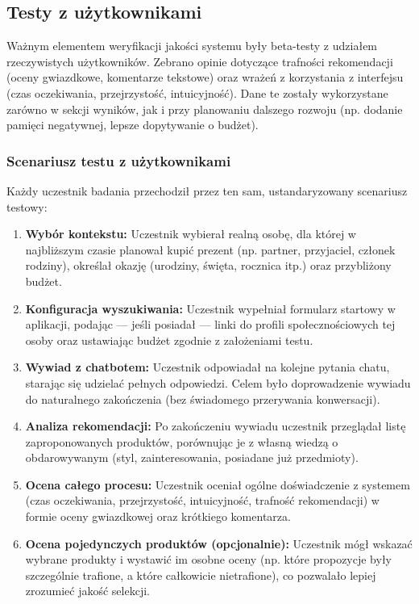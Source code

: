 \documentclass[12pt,a4paper]{article}
\begin{document}
\subsection{Testy z użytkownikami}
Ważnym elementem weryfikacji jakości systemu były beta-testy z udziałem rzeczywistych użytkowników. Zebrano opinie dotyczące trafności rekomendacji (oceny gwiazdkowe, komentarze tekstowe) oraz wrażeń z korzystania z interfejsu (czas oczekiwania, przejrzystość, intuicyjność). Dane te zostały wykorzystane zarówno w sekcji wyników, jak i przy planowaniu dalszego rozwoju (np. dodanie pamięci negatywnej, lepsze dopytywanie o budżet).

\subsubsection*{Scenariusz testu z użytkownikami}
Każdy uczestnik badania przechodził przez ten sam, ustandaryzowany scenariusz testowy:
\begin{enumerate}
    \item \textbf{Wybór kontekstu:} Uczestnik wybierał realną osobę, dla której w najbliższym czasie planował kupić prezent (np. partner, przyjaciel, członek rodziny), określał okazję (urodziny, święta, rocznica itp.) oraz przybliżony budżet.
    \item \textbf{Konfiguracja wyszukiwania:} Uczestnik wypełniał formularz startowy w aplikacji, podając — jeśli posiadał — linki do profili społecznościowych tej osoby oraz ustawiając budżet zgodnie z założeniami testu.
    \item \textbf{Wywiad z chatbotem:} Uczestnik odpowiadał na kolejne pytania chatu, starając się udzielać pełnych odpowiedzi. Celem było doprowadzenie wywiadu do naturalnego zakończenia (bez świadomego przerywania konwersacji).
    \item \textbf{Analiza rekomendacji:} Po zakończeniu wywiadu uczestnik przeglądał listę zaproponowanych produktów, porównując je z własną wiedzą o obdarowywanym (styl, zainteresowania, posiadane już przedmioty).
    \item \textbf{Ocena całego procesu:} Uczestnik oceniał ogólne doświadczenie z systemem (czas oczekiwania, przejrzystość, intuicyjność, trafność rekomendacji) w formie oceny gwiazdkowej oraz krótkiego komentarza.
    \item \textbf{Ocena pojedynczych produktów (opcjonalnie):} Uczestnik mógł wskazać wybrane produkty i wystawić im osobne oceny (np. które propozycje były szczególnie trafione, a które całkowicie nietrafione), co pozwalało lepiej zrozumieć jakość selekcji.
\end{enumerate}
\end{document}
